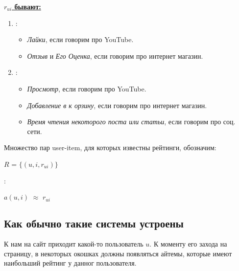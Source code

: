         \underline{\textbf{$r_{ui}$ бывают:}}
        \begin{enumerate}
            \item {}:\\
                \begin{itemize}
                    \item \textit{Лайки}, если говорим про YouTube.

                    \item \textit{Отзыв} и \textit{Его Оценка}, если говорим про интернет магазин.
                \end{itemize}

            \item {}:
                \begin{itemize}
                    \item \textit{Просмотр}, если говорим про YouTube.

                    \item \textit{Добавление в к орзину}, если говорим про интернет магазин.

                    \item \textit{Время чтения некоторого поста или статьи}, если говорим про соц. сети.
                \end{itemize}
        \end{enumerate}

        Множество пар user-item, для которых известны рейтинги, обозначим:
        \begin{center}
        \large
            $R$ = $\{(u, i, r_{ui}) \}$
        \end{center}
        
        :
        \begin{center}
        \Large
            $a(u, i)$ $\approx$ $r_{ui}$
        \end{center}

        \subsection{Как обычно такие системы устроены}

            К нам на сайт приходит какой-то пользователь $u$. К моменту его захода на страницу, в некоторых окошках должны появляться айтемы, которые имеют наибольший рейтинг у данног пользователя.\\

